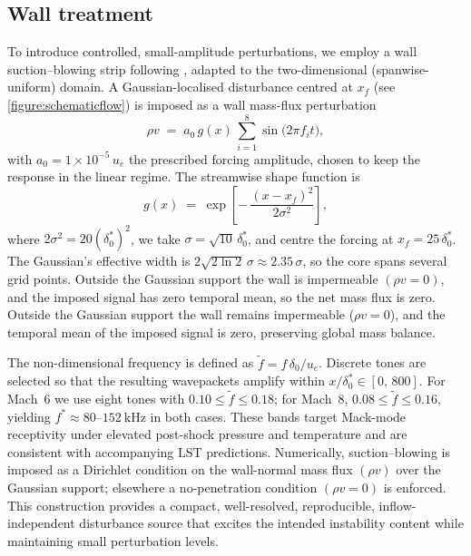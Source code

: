 \subsection{Wall treatment}
To introduce controlled, small-amplitude perturbations, we employ a wall suction--blowing strip following \cite{AlamSandham2000}, adapted to the two-dimensional (spanwise-uniform) domain. A Gaussian-localised disturbance centred at $x_f$ (see \cref{figure:schematicflow}) is imposed as a wall mass-flux perturbation
\begin{equation}
  \rho v \;=\; a_0\, g(x)\, \sum_{i=1}^{8} \sin\!\big(2\pi f_i t\big),
\end{equation}
with $a_0 = 1\times10^{-5}\,u_e$ the prescribed forcing amplitude, chosen to keep the response in the linear regime. The streamwise shape function is
\begin{equation}
  g(x) \;=\; \exp\!\left[-\,\frac{(x-x_f)^2}{2\sigma^2}\right],
\end{equation}
where \(2\sigma^2 = 20(\delta_0^{*})^2\), we take \(\sigma=\sqrt{10}\,\delta_0^{*}\), and centre the forcing at \(x_f = 25\,\delta_0^{*}\). The Gaussian’s effective width is \(2\sqrt{2\ln 2}\,\sigma \approx 2.35\,\sigma\), so the core spans several grid points. Outside the Gaussian support the wall is impermeable \((\rho v=0)\), and the imposed signal has zero temporal mean, so the net mass flux is zero. Outside the Gaussian support the wall remains impermeable ($\rho v=0$), and the temporal mean of the imposed signal is zero, preserving global mass balance.

The non-dimensional frequency is defined as $\tilde f = f\,\delta_0/u_e$. Discrete tones are selected so that the resulting wavepackets amplify within $x/\delta_0^{*}\in[0,\,800]$. For Mach~6 we use eight tones with $0.10 \le \tilde f \le 0.18$; for Mach~8, $0.08 \le \tilde f \le 0.16$, yielding $f^{*}\approx 80$–$152~\mathrm{kHz}$ in both cases. These bands target Mack-mode receptivity under elevated post-shock pressure and temperature and are consistent with accompanying \gls{LST} predictions. Numerically, suction–blowing is imposed as a Dirichlet condition on the wall-normal mass flux $(\rho v)$ over the Gaussian support; elsewhere a no-penetration condition $(\rho v=0)$ is enforced. This construction provides a compact, well-resolved, reproducible, inflow-independent disturbance source that excites the intended instability content while maintaining small perturbation levels.



